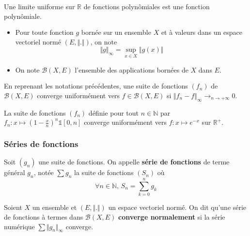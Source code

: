	
	\begin{corollary}
		Une limite uniforme sur $\mathbb{R}$ de fonctions polynômiales est une fonction polynômiale.
	\end{corollary}
	
	
	\begin{notation}
		\begin{itemize}
			\item Pour toute fonction $g$ bornée sur un ensemble $X$ et à valeurs dans un espace vectoriel normé $(E, \Vert . \Vert)$, on note
			\[ \Vert g \Vert_\infty = \sup_{x \in X} \Vert g(x) \Vert \]
			\item On note $\mathcal{B}(X,E)$ l'ensemble des applications bornées de $X$ dans $E$.
		\end{itemize}
	\end{notation}
	
	\begin{proposition}
		En reprenant les notations précédentes, une suite de fonctions $(f_n)$ de $\mathcal{B}(X,E)$ converge uniformément vers $f \in \mathcal{B}(X,E)$ si $\Vert f_n - f \Vert_\infty \longrightarrow_{n \rightarrow +\infty} 0$.
	\end{proposition}
	
	\begin{example}
		La suite de fonctions $(f_n)$ définie pour tout $n \in \mathbb{N}$ par $f_n : x \mapsto \left( 1 - \frac{x}{n} \right)^n \mathbb{1}[0,n]$ converge uniformément vers $f : x \mapsto e^{-x}$ sur $\mathbb{R}^+$.
	\end{example}
	
	\subsubsection{Séries de fonctions}
	
	
	\begin{definition}
		Soit $(g_n)$ une suite de fonctions. On appelle \textbf{série de fonctions} de terme général $g_n$, notée $\sum g_n$ la suite de fonctions $(S_n)$ où
		\[ \forall n \in \mathbb{N}, \, S_n = \sum_{k=0}^n g_k \]
	\end{definition}
	
	\begin{definition}
		Soient $X$ un ensemble et $(E, \Vert . \Vert)$ un espace vectoriel normé. On dit qu'une série de fonctions à termes dans $\mathcal{B}(X, E)$ \textbf{converge normalement} si la série numérique $\sum \Vert g_n \Vert_\infty$ converge.
	\end{definition}
	
